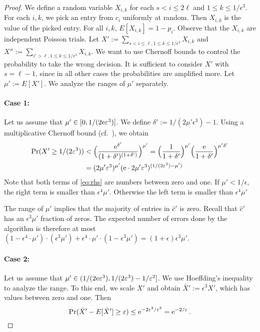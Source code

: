 \begin{proof}
We define a random variable $X_{i,k}$ for each $s < i \le 2\ell$ and $1 \le k \le 1/\epsilon^3$.
For each $i,k$, we pick an entry from $c_{i}$ uniformly at random. 
Then $X_{i,k}$ is the value of the picked entry.
For all $i,k$, $E[X_{i,k}] = 1 - p_{i}$. 
Observe that the $X_{i,k}$ are independent Poisson trials.
Let $X' := \sum_{s<i\le \ell,1 \le k \le 1/\epsilon^3} X_{i,k}$ 
and $X'':= \sum_{i' > \ell, 1 \le k \le 1/\epsilon^3} X_{i,k}$.
We want to use Chernoff bounds to control the probability to take the wrong decision.
It is sufficient to consider $X'$ with $s = \ell-1$, since in all other cases the probabilities are amplified more.
Let $\mu' := E[X']$.
We analyze the ranges of $\mu'$ separately.
\paragraph{Case 1:} Let us assume that $\mu' \in [0,1/(2\textrm{e}\varepsilon^3)]$.
We define $\delta' := 1/(2\mu'\epsilon^3) - 1$.
Using a multiplicative Chernoff bound (cf.~\cite{MU05_probability}), we obtain
\begin{align}
   \Pr(X' \ge 1/(2\epsilon^3)) &< \Bigl(\frac{\euler^{\delta'}}{(1+\delta')^{(1+\delta')}}\Bigr)^{\mu'} = \Bigl(\frac{1}{1 + \delta'}\Bigr)^{\mu'} \Bigl(\frac{\euler}{{1 + \delta'}}\Bigr)^{\mu'\delta'}\\
   &= (2 \mu' \epsilon^3)^{\mu'}(\euler \cdot 2\mu'\epsilon^3)^{(1/(2\epsilon^3)  - \mu')}\label{eq:rhs} %
\end{align}
Note that both terms of \eqref{eq:rhs} are numbers between zero and one.
If $\mu' < 1/\epsilon$, the right term is smaller than $\epsilon^4 \mu'$. 
Otherwise the left term is smaller than $\epsilon^4 \mu'$

The range of $\mu'$ implies that the majority of entries in $\hat{c}'$ is zero.
Recall that $\hat{c}'$ has an $\epsilon^3 \mu'$ fraction of zeros.
The expected number of errors done by the algorithm is therefore at most
$(1 - \epsilon^4 \cdot \mu') \cdot (\epsilon^3 \mu') + \epsilon^4 \cdot \mu' \cdot (1 - \epsilon^3 \mu') = (1+\epsilon) \epsilon^3 \mu'$.

\paragraph{Case 2:} Let us assume that $\mu' \in (1/(2\textrm{e}\varepsilon^3), 1/(2\varepsilon^3) - 1/\varepsilon^2]$.
We use Hoeffding's inequality \cite{Hoe63_probability} to analyze the range.
To this end, we scale $X'$ and obtain $\bar{X}':= \epsilon^3 X'$, which has values between zero and one.
Then 
\[
	\Pr(\bar{X}' - E[\bar{X}'] \ge \varepsilon) \le \textrm{e}^{-2\varepsilon^2/\varepsilon^3} = \textrm{e}^{-2/\varepsilon}\,.
\]


\end{proof}
